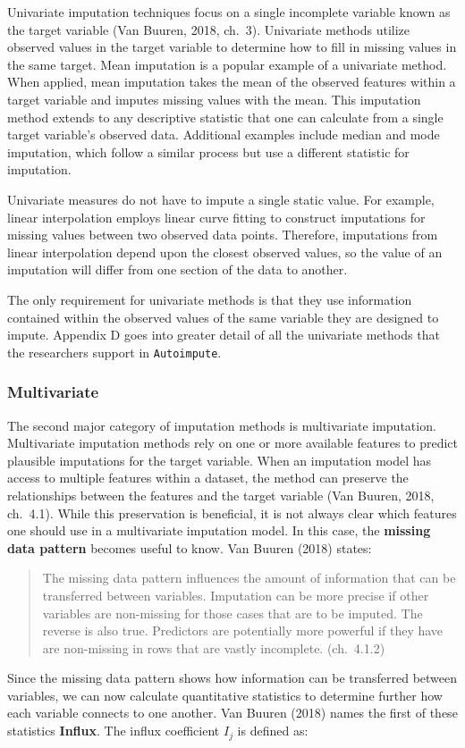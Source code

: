 \documentclass[12pt,oneside]{chicagocapstone}
\begin{document}
Univariate imputation techniques focus on a single incomplete variable
known as the target variable (Van Buuren, 2018, ch.~3). Univariate
methods utilize observed values in the target variable to determine how
to fill in missing values in the same target. Mean imputation is a
popular example of a univariate method. When applied, mean imputation
takes the mean of the observed features within a target variable and
imputes missing values with the mean. This imputation method extends to
any descriptive statistic that one can calculate from a single target
variable's observed data. Additional examples include median and mode
imputation, which follow a similar process but use a different statistic
for imputation.

Univariate measures do not have to impute a single static value. For
example, linear interpolation employs linear curve fitting to construct
imputations for missing values between two observed data points.
Therefore, imputations from linear interpolation depend upon the closest
observed values, so the value of an imputation will differ from one
section of the data to another.

The only requirement for univariate methods is that they use information
contained within the observed values of the same variable they are
designed to impute. Appendix D goes into greater detail of all the
univariate methods that the researchers support in \texttt{Autoimpute}.

\subsubsection*{Multivariate}\label{multivariate}

The second major category of imputation methods is multivariate
imputation. Multivariate imputation methods rely on one or more
available features to predict plausible imputations for the target
variable. When an imputation model has access to multiple features
within a dataset, the method can preserve the relationships between the
features and the target variable (Van Buuren, 2018, ch.~4.1). While this
preservation is beneficial, it is not always clear which features one
should use in a multivariate imputation model. In this case, the
\textbf{missing data pattern} becomes useful to know. Van Buuren (2018)
states:
\begin{quote}
The missing data pattern influences the amount of information that can
be transferred between variables. Imputation can be more precise if
other variables are non-missing for those cases that are to be imputed.
The reverse is also true. Predictors are potentially more powerful if
they have are non-missing in rows that are vastly incomplete.
(ch.~4.1.2)
\end{quote}
Since the missing data pattern shows how information can be transferred
between variables, we can now calculate quantitative statistics to
determine further how each variable connects to one another. Van Buuren
(2018) names the first of these statistics \textbf{Influx}. The influx
coefficient \(I_j\) is defined as:
\end{document}

